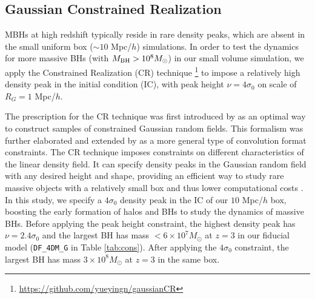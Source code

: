 \subsection{Gaussian Constrained Realization}
\label{subsec:CR}

MBHs at high redshift typically reside in rare density peaks, which are absent in the small uniform box ($\sim 10$ Mpc/$h$) simulations. 
In order to test the dynamics for more massive BHs (with $M_{\rm BH} > 10^8 M_{\odot}$) in our small volume simulation, we apply the Constrained Realization (CR) technique \footnote{\url{https://github.com/yueyingn/gaussianCR}} to impose a relatively high density peak in the initial condition (IC), with peak height $\nu = 4 \sigma_0$ on scale of $R_G = 1$ Mpc/$h$.  

The prescription for the CR technique was first introduced by \cite{Hoffman1991} as an optimal way to construct samples of constrained Gaussian random fields.
This formalism was further elaborated and extended by \cite{vandeWeygaert1996} as a more general type of convolution format constraints.
The CR technique imposes constraints on different characteristics of the linear density field. 
It can specify density peaks in the Gaussian random field with any desired height and shape, providing an efficient way to study rare massive objects with a relatively small box and thus lower computational costs \citep[e.g.][]{Ni2020}.
In this study, we specify a $4 \sigma_0$ density peak in the IC of our $10$ Mpc/$h$ box, boosting the early formation of halos and BHs to study the dynamics of massive BHs. Before applying the peak height constraint, the highest density peak has $\nu = 2.4 \sigma_0$ and the largest BH has mass $<6\times 10^7M_\odot$ at $z=3$ in our fiducial model (\texttt{DF\_4DM\_G} in Table \ref{tab:cons}). After applying the $4 \sigma_0$ constraint, the largest BH has mass $3\times 10^8 M_\odot$ at $z=3$ in the same box.

